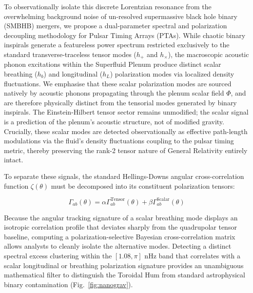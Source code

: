 \documentclass[aps,prd,10pt,twocolumn,superscriptaddress,nofootinbib,floatfix]{revtex4-2}
\begin{document}
To observationally isolate this discrete Lorentzian resonance from the overwhelming background noise of un-resolved supermassive black hole binary (SMBHB) mergers, we propose a dual-parameter spectral and polarization decoupling methodology for Pulsar Timing Arrays (PTAs). While chaotic binary inspirals generate a featureless power spectrum restricted exclusively to the standard transverse-traceless tensor modes ($h_+$ and $h_{\times}$), the macroscopic acoustic phonon excitations within the Superfluid Plenum produce distinct scalar breathing ($h_b$) and longitudinal ($h_L$) polarization modes via localized density fluctuations. We emphasise that these scalar polarization modes are sourced natively by acoustic phonons propagating through the plenum scalar field $\Phi$, and are therefore physically distinct from the tensorial modes generated by binary inspirals. The Einstein-Hilbert tensor sector remains unmodified; the scalar signal is a prediction of the plenum's acoustic structure, not of modified gravity. Crucially, these scalar modes are detected observationally as effective path-length modulations via the fluid's density fluctuations coupling to the pulsar timing metric, thereby preserving the rank-2 tensor nature of General Relativity entirely intact.

To separate these signals, the standard Hellings-Downs angular cross-correlation function $\zeta(\theta)$ must be decomposed into its constituent polarization tensors:

\begin{equation}
\Gamma_{ab}(\theta) = \alpha \Gamma_{ab}^{\text{Tensor}}(\theta) + \beta \Gamma_{ab}^{\text{Scalar}}(\theta)
\end{equation}

Because the angular tracking signature of a scalar breathing mode displays an isotropic correlation profile that deviates sharply from the quadrupolar tensor baseline, computing a polarization-selective Bayesian cross-correlation matrix allows analysts to cleanly isolate the alternative modes. Detecting a distinct spectral excess clustering within the $[1.08, \pi]\text{ nHz}$ band that correlates with a scalar longitudinal or breathing polarization signature provides an unambiguous mathematical filter to distinguish the Toroidal Hum from standard astrophysical binary contamination (Fig.~\ref{fig:nanograv}).
\end{document}
